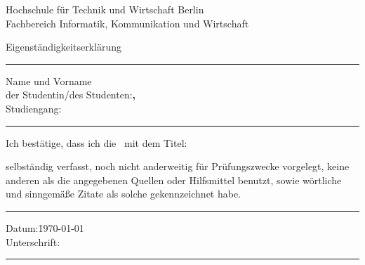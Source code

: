 %

\thispagestyle{empty}				%
\begin{minipage}{0.65\textwidth}
  Hochschule für Technik und Wirtschaft Berlin\\
  Fachbereich Informatik, Kommunikation und Wirtschaft\\[1.5cm]
\end{minipage}

Eigenständigkeitserklärung\\
\rule[1ex]{\textwidth}{0.5pt}
\vspace*{0.5cm}
\begin{tabbing}
  Name und Vorname\\
  der Studentin/des Studenten:\qquad\=\textbf{\IhrNachname, \IhrVorname}\\[1cm]
  Studiengang:                      \>\textbf{\IhrStudiengang}
\end{tabbing}
\rule[1ex]{\textwidth}{0.5pt}
\vspace*{0.5cm}
Ich bestätige, dass ich die \IhreArbeit\ mit dem Titel:
\begin{center}
  \textbf{\IhrTitelDE}
\end{center}
\vspace*{0.5cm}
selbständig verfasst, noch nicht anderweitig für Prüfungszwecke vorgelegt, keine anderen als die angegebenen Quellen oder Hilfsmittel benutzt, sowie wörtliche und sinngemäße Zitate als solche gekennzeichnet habe.\\[0.5cm]
\rule[1ex]{\textwidth}{0.5pt}
\begin{tabbing}
  Datum:\hspace{2cm}\=\today\\[1cm]
  Unterschrift:\> 
\end{tabbing}
\rule[1ex]{\textwidth}{0.5pt}
\clearpage